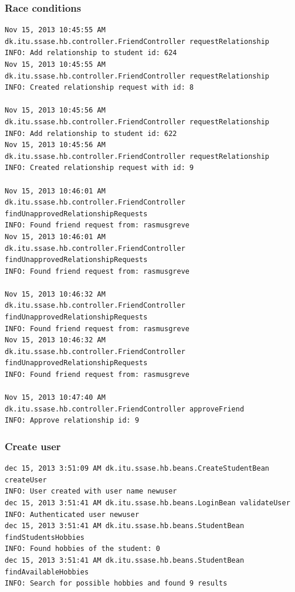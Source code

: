 \documentclass[a4paper]{article}
\begin{document}
\subsubsection{Race conditions \label{sec:appendix:racecondition}}
\begin{verbatim}
Nov 15, 2013 10:45:55 AM 
dk.itu.ssase.hb.controller.FriendController requestRelationship
INFO: Add relationship to student id: 624
Nov 15, 2013 10:45:55 AM 
dk.itu.ssase.hb.controller.FriendController requestRelationship
INFO: Created relationship request with id: 8

Nov 15, 2013 10:45:56 AM 
dk.itu.ssase.hb.controller.FriendController requestRelationship
INFO: Add relationship to student id: 622
Nov 15, 2013 10:45:56 AM 
dk.itu.ssase.hb.controller.FriendController requestRelationship
INFO: Created relationship request with id: 9

Nov 15, 2013 10:46:01 AM 
dk.itu.ssase.hb.controller.FriendController findUnapprovedRelationshipRequests
INFO: Found friend request from: rasmusgreve
Nov 15, 2013 10:46:01 AM 
dk.itu.ssase.hb.controller.FriendController findUnapprovedRelationshipRequests
INFO: Found friend request from: rasmusgreve

Nov 15, 2013 10:46:32 AM 
dk.itu.ssase.hb.controller.FriendController findUnapprovedRelationshipRequests
INFO: Found friend request from: rasmusgreve
Nov 15, 2013 10:46:32 AM 
dk.itu.ssase.hb.controller.FriendController findUnapprovedRelationshipRequests
INFO: Found friend request from: rasmusgreve

Nov 15, 2013 10:47:40 AM 
dk.itu.ssase.hb.controller.FriendController approveFriend
INFO: Approve relationship id: 9
\end{verbatim}

\subsubsection{Create user}
\begin{verbatim}
dec 15, 2013 3:51:09 AM dk.itu.ssase.hb.beans.CreateStudentBean createUser
INFO: User created with user name newuser
dec 15, 2013 3:51:41 AM dk.itu.ssase.hb.beans.LoginBean validateUser
INFO: Authenticated user newuser
dec 15, 2013 3:51:41 AM dk.itu.ssase.hb.beans.StudentBean findStudentsHobbies
INFO: Found hobbies of the student: 0
dec 15, 2013 3:51:41 AM dk.itu.ssase.hb.beans.StudentBean findAvailableHobbies
INFO: Search for possible hobbies and found 9 results
\end{verbatim}
\end{document}

